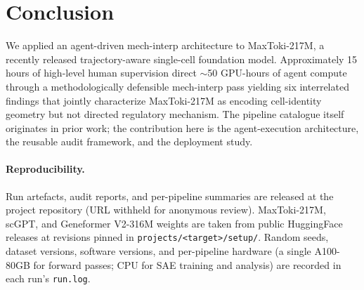 \documentclass{article}
\newcommand{\maxtoki}{MaxToki-217M\xspace}
\newcommand{\geneformer}{Geneformer V2-316M\xspace}
\begin{document}
\section{Conclusion}

We applied an agent-driven mech-interp architecture to \maxtoki{},
a recently released trajectory-aware single-cell foundation
model. Approximately 15 hours of high-level human supervision
direct $\sim$50 GPU-hours of agent compute through a
methodologically defensible mech-interp pass yielding six
interrelated findings that jointly characterize \maxtoki{} as
encoding cell-identity geometry but not directed regulatory
mechanism. The pipeline catalogue itself originates in prior work;
the contribution here is the agent-execution architecture, the
reusable audit framework, and the deployment study.

\paragraph{Reproducibility.} Run artefacts, audit reports, and
per-pipeline summaries are released at the project repository
(URL withheld for anonymous review). \maxtoki{}, scGPT,
and \geneformer{} weights are taken from public HuggingFace
releases at revisions pinned in \texttt{projects/<target>/setup/}.
Random seeds, dataset versions, software versions, and per-pipeline
hardware (a single A100-80GB for forward passes; CPU for SAE
training and analysis) are recorded in each run's
\texttt{run.log}.



\end{document}
